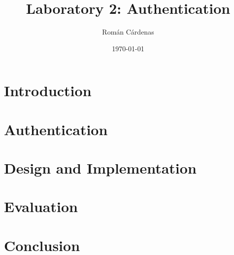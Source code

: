 \documentclass[12pt]{article}
\title{Laboratory 2: Authentication}					%
\author{Román Cárdenas}									%
\date{\today}											%
\begin{document}

\tableofcontents
\listoffigures
\lstlistoflistings
\pagebreak
\section{Introduction}\label{sec:intro}
	
	\pagebreak
\section{Authentication}\label{sec:auth}
	
	\pagebreak
\section{Design and Implementation}\label{sec:design}
	
	\pagebreak
\section{Evaluation}\label{sec:eval}
	
	\pagebreak
\section{Conclusion}\label{sec:conc}
		
	\pagebreak
\clearpage
\nocite{*}						  %

\end{document}
